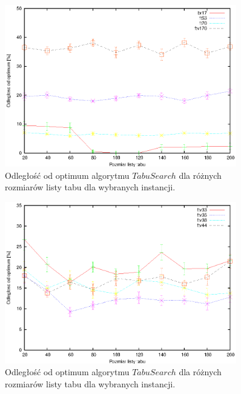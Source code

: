 \begin{figure}
\begin{center}
\includegraphics[width=0.9\textwidth]{wykresy/tabu_quality_size_1}
\end{center}
\caption{Odległość od optimum algorytmu $Tabu Search$ dla różnych rozmiarów
listy tabu dla wybranych instancji.}
\label{tabu_quality_size_1}
\end{figure}

\begin{figure}
\begin{center}
\includegraphics[width=0.9\textwidth]{wykresy/tabu_quality_size_2}
\end{center}
\caption{Odległość od optimum algorytmu $Tabu Search$ dla różnych rozmiarów
listy tabu dla wybranych instancji.}
\label{tabu_quality_size_2}
\end{figure}


